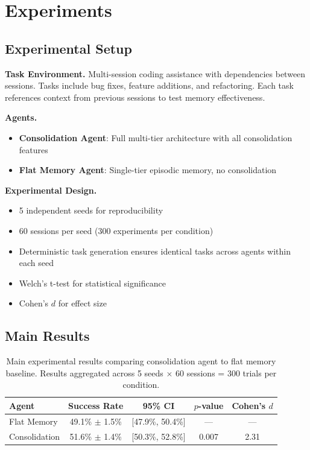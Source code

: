 \documentclass[11pt]{article}
\begin{document}
\section{Experiments}

\subsection{Experimental Setup}

\textbf{Task Environment.} Multi-session coding assistance with dependencies between sessions. Tasks include bug fixes, feature additions, and refactoring. Each task references context from previous sessions to test memory effectiveness.

\textbf{Agents.}
\begin{itemize}
    \item \textbf{Consolidation Agent}: Full multi-tier architecture with all consolidation features
    \item \textbf{Flat Memory Agent}: Single-tier episodic memory, no consolidation
\end{itemize}

\textbf{Experimental Design.}
\begin{itemize}
    \item 5 independent seeds for reproducibility
    \item 60 sessions per seed (300 experiments per condition)
    \item Deterministic task generation ensures identical tasks across agents within each seed
    \item Welch's t-test for statistical significance
    \item Cohen's $d$ for effect size
\end{itemize}

\subsection{Main Results}

\begin{table}[t]
\centering
\caption{Main experimental results comparing consolidation agent to flat memory baseline. Results aggregated across 5 seeds $\times$ 60 sessions = 300 trials per condition.}
\label{tab:main_results}
\begin{tabular}{@{}lcccc@{}}
\toprule
Agent & Success Rate & 95\% CI & $p$-value & Cohen's $d$ \\
\midrule
Flat Memory & 49.1\% $\pm$ 1.5\% & [47.9\%, 50.4\%] & --- & --- \\
Consolidation & 51.6\% $\pm$ 1.4\% & [50.3\%, 52.8\%] & 0.007 & 2.31 \\
\bottomrule
\end{tabular}
\end{table}
\end{document}
